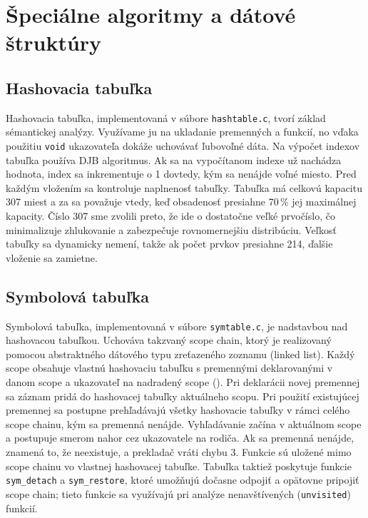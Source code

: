\documentclass{article}
\begin{document}
\section{Špeciálne algoritmy a dátové štruktúry}
    \subsection{Hashovacia tabuľka}
        Hashovacia tabuľka, implementovaná v súbore \texttt{hashtable.c}, tvorí základ sémantickej analýzy. Využívame ju na ukladanie premenných a funkcií, no vďaka použitiu \texttt{void} ukazovateľa dokáže uchovávať ľubovoľné dáta. Na výpočet indexov tabuľka používa DJB algoritmus. Ak sa na vypočítanom indexe už nachádza hodnota, index sa inkrementuje o 1 dovtedy, kým sa nenájde voľné miesto. Pred každým vložením sa kontroluje naplnenosť tabuľky. Tabuľka má celkovú kapacitu 307 miest a za  sa považuje vtedy, keď obsadenosť presiahne 70\,\% jej maximálnej kapacity. Číslo 307 sme zvolili preto, že ide o dostatočne veľké prvočíslo, čo minimalizuje zhlukovanie a zabezpečuje rovnomernejšiu distribúciu. Veľkosť tabuľky sa dynamicky nemení, takže ak počet prvkov presiahne 214, ďalšie vloženie sa zamietne.

    \subsection{Symbolová tabuľka}
        Symbolová tabuľka, implementovaná v súbore \texttt{symtable.c}, je nadstavbou nad hashovacou tabuľkou. Uchováva takzvaný scope chain, ktorý je realizovaný pomocou abstraktného dátového typu zreťazeného zoznamu (linked list). Každý scope obsahuje vlastnú hashovaciu tabuľku s premennými deklarovanými v danom scope a ukazovateľ na nadradený scope (). Pri deklarácii novej premennej sa záznam pridá do hashovacej tabuľky aktuálneho scopu. Pri použití existujúcej premennej sa postupne prehľadávajú všetky hashovacie tabuľky v rámci celého scope chainu, kým sa premenná nenájde. Vyhľadávanie začína v aktuálnom scope a postupuje smerom nahor cez ukazovatele na rodiča. Ak sa premenná nenájde, znamená to, že neexistuje, a prekladač vráti chybu 3. Funkcie sú uložené mimo scope chainu vo vlastnej hashovacej tabuľke. Tabuľka taktiež poskytuje funkcie \texttt{sym\_detach} a \texttt{sym\_restore}, ktoré umožňujú dočasne odpojiť a opätovne pripojiť scope chain; tieto funkcie sa využívajú pri analýze nenavštívených (\texttt{unvisited}) funkcií.
    
\end{document}
